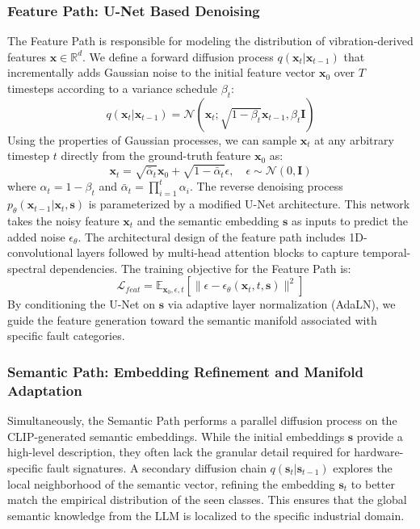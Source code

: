 \subsubsection{Feature Path: U-Net Based Denoising}
The Feature Path is responsible for modeling the distribution of vibration-derived features $\mathbf{x} \in \mathbb{R}^d$. We define a forward diffusion process $q(\mathbf{x}_t | \mathbf{x}_{t-1})$ that incrementally adds Gaussian noise to the initial feature vector $\mathbf{x}_0$ over $T$ timesteps according to a variance schedule $\beta_t$:
\begin{equation}
q(\mathbf{x}_t | \mathbf{x}_{t-1}) = \mathcal{N}(\mathbf{x}_t; \sqrt{1 - \beta_t} \mathbf{x}_{t-1}, \beta_t \mathbf{I})
\end{equation}
Using the properties of Gaussian processes, we can sample $\mathbf{x}_t$ at any arbitrary timestep $t$ directly from the ground-truth feature $\mathbf{x}_0$ as:
\begin{equation}
\mathbf{x}_t = \sqrt{\bar{\alpha}_t} \mathbf{x}_0 + \sqrt{1 - \bar{\alpha}_t} \epsilon, \quad \epsilon \sim \mathcal{N}(0, \mathbf{I})
\end{equation}
where $\alpha_t = 1 - \beta_t$ and $\bar{\alpha}_t = \prod_{i=1}^t \alpha_i$. The reverse denoising process $p_\theta(\mathbf{x}_{t-1} | \mathbf{x}_t, \mathbf{s})$ is parameterized by a modified U-Net architecture. This network takes the noisy feature $\mathbf{x}_t$ and the semantic embedding $\mathbf{s}$ as inputs to predict the added noise $\epsilon_\theta$. The architectural design of the feature path includes 1D-convolutional layers followed by multi-head attention blocks to capture temporal-spectral dependencies. The training objective for the Feature Path is:
\begin{equation}
\mathcal{L}_{feat} = \mathbb{E}_{\mathbf{x}_0, \epsilon, t} \left[ \| \epsilon - \epsilon_\theta(\mathbf{x}_t, t, \mathbf{s}) \|^2 \right]
\end{equation}
By conditioning the U-Net on $\mathbf{s}$ via adaptive layer normalization (AdaLN), we guide the feature generation toward the semantic manifold associated with specific fault categories.

\subsubsection{Semantic Path: Embedding Refinement and Manifold Adaptation}
Simultaneously, the Semantic Path performs a parallel diffusion process on the CLIP-generated semantic embeddings. While the initial embeddings $\mathbf{s}$ provide a high-level description, they often lack the granular detail required for hardware-specific fault signatures. A secondary diffusion chain $q(\mathbf{s}_t | \mathbf{s}_{t-1})$ explores the local neighborhood of the semantic vector, refining the embedding $\mathbf{s}_t$ to better match the empirical distribution of the seen classes. This ensures that the global semantic knowledge from the LLM is localized to the specific industrial domain.

